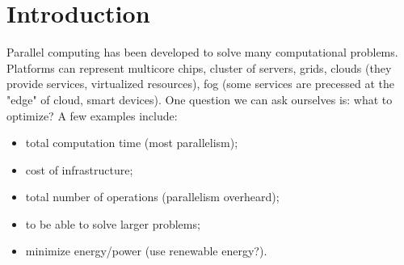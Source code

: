 \documentclass[./main]{subfiles}
\begin{document}
  \chapter{Introduction}

  Parallel computing has been developed to solve many computational problems.
  Platforms can represent multicore chips, cluster of servers, grids, clouds (they provide services, virtualized resources), fog (some services are precessed at the "edge" of cloud, smart devices).
  One question we can ask ourselves is: what to optimize?
  A few examples include:
  \begin{itemize}
    \item total computation time (most parallelism);
    \item cost of infrastructure;
    \item total number of operations (parallelism overheard);
    \item to be able to solve larger problems;
    \item minimize energy/power (use renewable energy?).
  \end{itemize}
\end{document}
